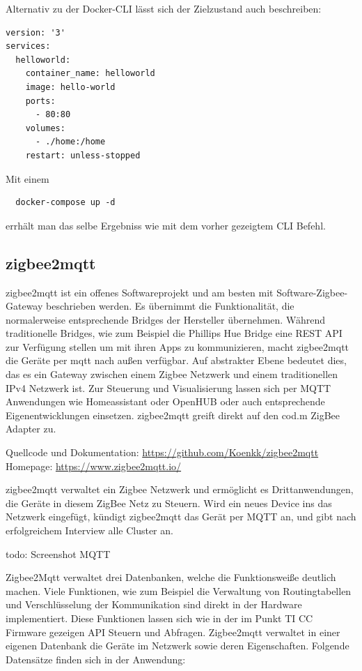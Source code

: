 Alternativ zu der Docker-CLI lässt sich der Zielzustand auch beschreiben:

\begin{lstlisting}
version: '3'
services:
  helloworld:
    container_name: helloworld
    image: hello-world
    ports:
      - 80:80
    volumes:
      - ./home:/home
    restart: unless-stopped
\end{lstlisting}

Mit einem 
\begin{lstlisting}
  docker-compose up -d
\end{lstlisting}

errhält man das selbe Ergebniss wie mit dem vorher gezeigtem CLI Befehl.

\subsection{zigbee2mqtt}

zigbee2mqtt ist ein offenes Softwareprojekt und am besten mit \grqq Software-Zigbee-Gateway \grqq beschrieben werden. Es übernimmt die Funktionalität, die normalerweise entsprechende
\grqq Bridges \grqq der Hersteller übernehmen. Während traditionelle Bridges, wie zum Beispiel die Phillips Hue Bridge eine REST API zur Verfügung stellen um mit ihren
Apps zu kommunizieren, macht zigbee2mqtt die Geräte per mqtt nach außen verfügbar. Auf abstrakter Ebene bedeutet dies, das es ein Gateway zwischen einem Zigbee Netzwerk und
einem traditionellen IPv4 Netzwerk ist. Zur Steuerung und Visualisierung lassen sich per MQTT Anwendungen wie \grqq Homeassistant \grqq oder \grqq OpenHUB \grqq{} oder auch entsprechende
Eigenentwicklungen einsetzen. \grqq zigbee2mqtt \grqq{} greift direkt auf den \grqq cod.m \grqq{} ZigBee Adapter zu.

Quellcode und Dokumentation: \url{https://github.com/Koenkk/zigbee2mqtt}
Homepage: \url{https://www.zigbee2mqtt.io/}

\grqq zigbee2mqtt \grqq{} verwaltet ein Zigbee Netzwerk und ermöglicht es Drittanwendungen, die Geräte in diesem ZigBee Netz zu Steuern. Wird ein neues Device ins das Netzwerk eingefügt,
kündigt zigbee2mqtt das Gerät per MQTT an, und gibt nach erfolgreichem Interview alle Cluster an.

todo: Screenshot MQTT

Zigbee2Mqtt verwaltet drei Datenbanken, welche die Funktionsweiße deutlich machen. Viele Funktionen, wie zum Beispiel die Verwaltung von Routingtabellen und
Verschlüsselung der Kommunikation sind direkt in der Hardware implementiert. Diese Funktionen lassen sich wie in der im Punkt TI CC Firmware gezeigen API Steuern und Abfragen.
Zigbee2mqtt verwaltet in einer eigenen Datenbank die Geräte im Netzwerk sowie deren Eigenschaften.
Folgende Datensätze finden sich in der Anwendung:


